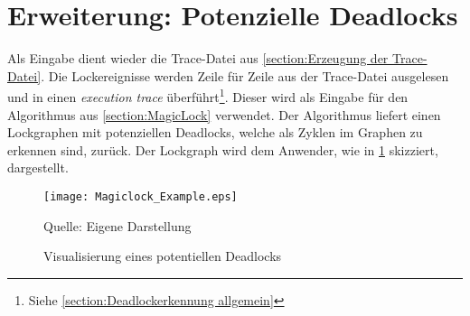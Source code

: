 \section{Erweiterung: Potenzielle Deadlocks}
\label{section:Erweiterung: Potenzielle Deadlocks}
Als Eingabe dient wieder die Trace-Datei aus \cref{section:Erzeugung der
Trace-Datei}. Die Lockereignisse werden Zeile für Zeile aus der Trace-Datei
ausgelesen und in einen \emph{execution trace} überführt\footnote{Siehe
\cref{section:Deadlockerkennung allgemein}}. Dieser wird als Eingabe für den
Algorithmus aus \cref{section:MagicLock} verwendet. Der Algorithmus liefert
einen Lockgraphen mit potenziellen Deadlocks, welche als Zyklen im Graphen zu
erkennen sind, zurück. Der Lockgraph wird dem Anwender, wie in
\cref{fig:Magiclock_Example} skizziert, dargestellt.
\begin{figure}[ht]
  \begin{center}
    \texttt{[image: Magiclock\_Example.eps]}
  \end{center}
  \footnotesize\sffamily Quelle: Eigene Darstellung
  \caption{Visualisierung eines potentiellen Deadlocks}
  \label{fig:Magiclock_Example}
\end{figure}
